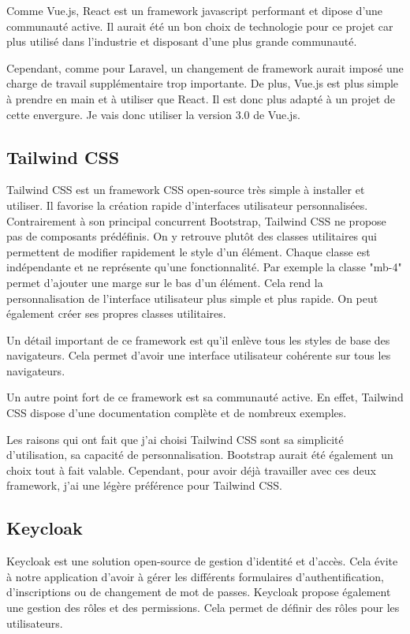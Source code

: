 Comme Vue.js, React est un framework javascript performant et dipose d'une communauté active. Il aurait été un bon choix de technologie pour ce projet car plus utilisé dans l'industrie et disposant d'une plus grande communauté.

Cependant, comme pour Laravel, un changement de framework aurait imposé une charge de travail supplémentaire trop importante. De plus, Vue.js est plus simple à prendre en main et à utiliser que React. Il est donc plus adapté à un projet de cette envergure. Je vais donc utiliser la version 3.0 de Vue.js.

\subsection{Tailwind CSS}
Tailwind CSS est un framework CSS open-source très simple à installer et utiliser. Il favorise la création rapide d'interfaces utilisateur personnalisées. Contrairement à son principal concurrent Bootstrap, Tailwind CSS ne propose pas de composants prédéfinis. On y retrouve plutôt des classes utilitaires qui permettent de modifier rapidement le style d'un élément. Chaque classe est indépendante et ne représente qu'une fonctionnalité. Par exemple la classe "mb-4" permet d'ajouter une marge sur le bas d'un élément. Cela rend la personnalisation de l'interface utilisateur plus simple et plus rapide. On peut également créer ses propres classes utilitaires.

Un détail important de ce framework est qu'il enlève tous les styles de base des navigateurs. Cela permet d'avoir une interface utilisateur cohérente sur tous les navigateurs.

Un autre point fort de ce framework est sa communauté active. En effet, Tailwind CSS dispose d'une documentation complète et de nombreux exemples.

Les raisons qui ont fait que j'ai choisi Tailwind CSS sont sa simplicité d'utilisation, sa capacité de personnalisation. Bootstrap aurait été également un choix tout à fait valable. Cependant, pour avoir déjà travailler avec ces deux framework, j'ai une légère préférence pour Tailwind CSS.

\subsection{Keycloak}
Keycloak est une solution open-source de gestion d'identité et d'accès. Cela évite à notre application d'avoir à gérer les différents formulaires d'authentification, d'inscriptions ou de changement de mot de passes. Keycloak propose également une gestion des rôles et des permissions. Cela permet de définir des rôles pour les utilisateurs.

